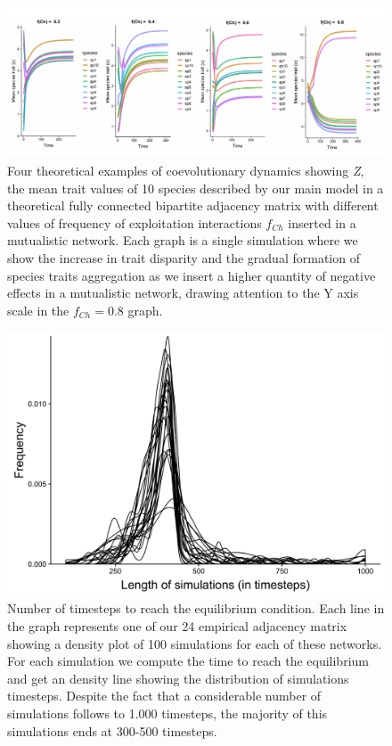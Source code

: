 \documentclass[a4paper, 12pt]{article}
\begin{document}
\begin{singlespace}
\begin{figure}[H]
 \centering
  \includegraphics[width=\linewidth]{Sup_Figura_3.pdf}
  \vspace*{-7mm}
  \caption{Four theoretical examples of coevolutionary dynamics showing \textit{Z}, the mean trait values of 10 species described by our main model in a theoretical fully connected bipartite adjacency matrix with different values of frequency of exploitation interactions $f_{Ch}$ inserted in a mutualistic network. Each graph is a single simulation where we show the increase in trait disparity and the gradual formation of species traits aggregation as we insert a higher quantity of negative effects in a mutualistic network, drawing attention to the Y axis scale in the $f_{Ch} = 0.8$ graph.}
  \label{supfig:3}
\end{figure}

\begin{figure}[H]
 \centering
  \includegraphics[width=\linewidth]{Sup_Figura_4.png}
  \vspace*{-7mm}
  \caption{Number of timesteps to reach the equilibrium condition. Each line in the graph represents one of our 24 empirical adjacency matrix showing a density plot of 100 simulations for each of these networks. For each simulation we compute the time to reach the equilibrium and get an density line showing the distribution of simulations timesteps. Despite the fact that a considerable number of simulations follows to 1.000 timesteps, the majority of this simulations ends at 300-500 timesteps.}
  \label{supfig:4}
\end{figure}


\end{singlespace}
\end{document}
